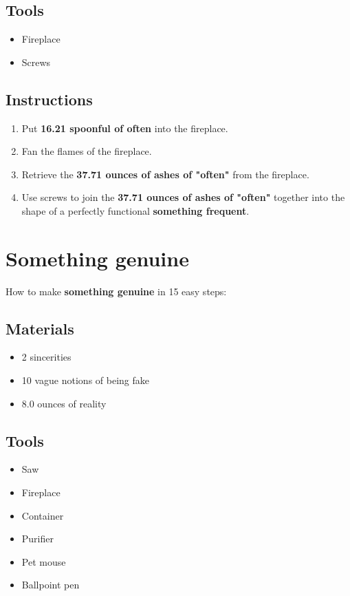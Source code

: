 \documentclass{article}
\begin{document}
\subsection{Tools}\begin{itemize}
\item 
Fireplace
\item 
Screws
\end{itemize}
\subsection{Instructions}\begin{enumerate}
\item 
Put \textbf{16.21 spoonful of often} into the fireplace.
\item 
Fan the flames of the fireplace.
\item 
Retrieve the \textbf{37.71 ounces of ashes of "often"} from the fireplace.
\item 
Use screws to join the \textbf{37.71 ounces of ashes of "often"} together into the shape of a perfectly functional \textbf{something frequent}.
\end{enumerate}
\newpage
\section{Something genuine}How to make \textbf{something genuine} in 15 easy steps:

\subsection{Materials}\begin{itemize}
\item 
2 sincerities
\item 
10 vague notions of being fake
\item 
8.0 ounces of reality
\end{itemize}
\subsection{Tools}\begin{itemize}
\item 
Saw
\item 
Fireplace
\item 
Container
\item 
Purifier
\item 
Pet mouse
\item 
Ballpoint pen
\end{itemize}
\end{document}
